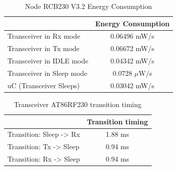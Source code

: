 \begin{table}[h]\footnotesize
\begin{center}
 \begin{tabular}{|l|c|}
  \noalign{\vspace*{0.5cm}}
  \hline
  & \textbf{Energy Consumption} \\
  \hline
  Transceiver in \ac{Rx} mode & 0.06496 mW/s \\
  \hline 
  Transceiver in \ac{Tx} mode & 0.06672 mW/s \\
  \hline
  Transceiver in IDLE mode & 0.04342 mW/s \\
  \hline
  Transceiver in Sleep mode & 0.0728 $\mu$W/s \\
  \hline
  \ac{uC} (Transceiver Sleeps) & 0.03042 mW/s \\
  \hline
  \end{tabular}
 \caption{Node RCB230 V3.2 Energy Consumption \cite{LPLandOLP}}
 \label{tab:NodeEnergyConsumption}
\end{center}
\end{table}

\begin{table}[h]\footnotesize
\begin{center}
 \begin{tabular}{|l|c|}
  \noalign{\vspace*{0.5cm}}
  \hline
  & \textbf{Transition timing} \\
  \hline
  Transition: Sleep -> \ac{Rx} & 1.88 ms \\
  \hline 
  Transition: \ac{Tx} -> Sleep & 0.94 ms \\
  \hline
  Transition: \ac{Rx} -> Sleep & 0.94 ms \\
  \hline
  \end{tabular}
 \caption{Transceiver AT86RF230 transition timing \cite{LPLandOLP}}
 \label{tab:NodeTiming}
\end{center}
\end{table}
